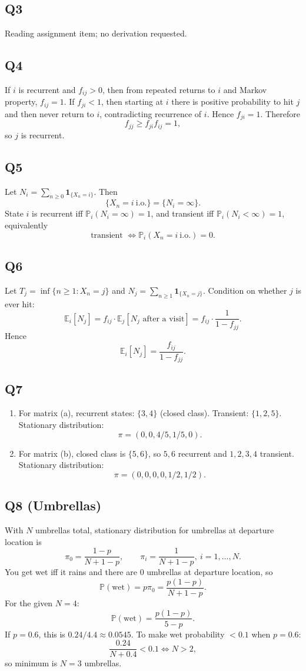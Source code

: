 \documentclass[11pt]{article}
\newcommand{\PP}{\mathbb{P}}
\newcommand{\EE}{\mathbb{E}}
\newcommand{\1}{\mathbf{1}}
\begin{document}
\subsection*{Q3}
Reading assignment item; no derivation requested.

\subsection*{Q4}
If $i$ is recurrent and $f_{ij}>0$, then from repeated returns to $i$ and Markov property, $f_{ij}=1$. If $f_{ji}<1$, then starting at $i$ there is positive probability to hit $j$ and then never return to $i$, contradicting recurrence of $i$. Hence $f_{ji}=1$. Therefore
\[
f_{jj}\ge f_{ji}f_{ij}=1,
\]
so $j$ is recurrent.

\subsection*{Q5}
Let $N_i=\sum_{n\ge0}\1_{\{X_n=i\}}$. Then
\[
\{X_n=i\ \text{i.o.}\}=\{N_i=\infty\}.
\]
State $i$ is recurrent iff $\PP_i(N_i=\infty)=1$, and transient iff $\PP_i(N_i<\infty)=1$, equivalently
\[
\text{transient }\Longleftrightarrow \PP_i(X_n=i\ \text{i.o.})=0.
\]

\subsection*{Q6}
Let $T_j=\inf\{n\ge1:X_n=j\}$ and $N_j=\sum_{n\ge1}\1_{\{X_n=j\}}$.
Condition on whether $j$ is ever hit:
\[
\EE_i[N_j]=f_{ij}\cdot\EE_j[N_j\text{ after a visit}] = f_{ij}\cdot\frac1{1-f_{jj}}.
\]
Hence
\[
\EE_i[N_j]=\frac{f_{ij}}{1-f_{jj}}.
\]

\subsection*{Q7}
\begin{enumerate}[label=(\alph*)]
\item For matrix (a), recurrent states: $\{3,4\}$ (closed class). Transient: $\{1,2,5\}$.
Stationary distribution:
\[
\pi=(0,0,4/5,1/5,0).
\]
\item For matrix (b), closed class is $\{5,6\}$, so $5,6$ recurrent and $1,2,3,4$ transient.
Stationary distribution:
\[
\pi=(0,0,0,0,1/2,1/2).
\]
\end{enumerate}

\subsection*{Q8 (Umbrellas)}
With $N$ umbrellas total, stationary distribution for umbrellas at departure location is
\[
\pi_0=\frac{1-p}{N+1-p},\qquad \pi_i=\frac1{N+1-p},\ i=1,\dots,N.
\]
You get wet iff it rains and there are $0$ umbrellas at departure location, so
\[
\PP(\text{wet})=p\pi_0=\frac{p(1-p)}{N+1-p}.
\]
For the given $N=4$:
\[
\PP(\text{wet})=\frac{p(1-p)}{5-p}.
\]
If $p=0.6$, this is $0.24/4.4\approx0.0545$.
To make wet probability $<0.1$ when $p=0.6$:
\[
\frac{0.24}{N+0.4}<0.1\iff N>2,
\]
so minimum is $N=3$ umbrellas.
\end{document}
